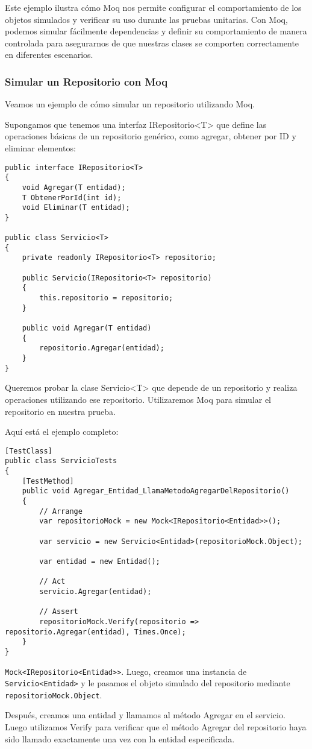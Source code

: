 \documentclass[executivepaper]{article}
\begin{document}
Este ejemplo ilustra cómo Moq nos permite configurar el comportamiento de los objetos simulados y verificar su uso durante las pruebas unitarias. Con Moq, podemos simular fácilmente dependencias y definir su comportamiento de manera controlada para asegurarnos de que nuestras clases se comporten correctamente en diferentes escenarios.

\subsubsection*{Simular un Repositorio con Moq}

Veamos un ejemplo de cómo simular un repositorio utilizando Moq.

Supongamos que tenemos una interfaz IRepositorio<T> que define las operaciones básicas de un repositorio genérico, como agregar, obtener por ID y eliminar elementos:

\begin{lstlisting}
public interface IRepositorio<T>
{
    void Agregar(T entidad);
    T ObtenerPorId(int id);
    void Eliminar(T entidad);
}    

public class Servicio<T>
{
    private readonly IRepositorio<T> repositorio;

    public Servicio(IRepositorio<T> repositorio)
    {
        this.repositorio = repositorio;
    }

    public void Agregar(T entidad)
    {
        repositorio.Agregar(entidad);
    }
}

\end{lstlisting}

Queremos probar la clase Servicio<T> que depende de un repositorio y realiza operaciones utilizando ese repositorio. Utilizaremos Moq para simular el repositorio en nuestra prueba.

Aquí está el ejemplo completo:

\begin{lstlisting}
[TestClass]
public class ServicioTests
{
    [TestMethod]
    public void Agregar_Entidad_LlamaMetodoAgregarDelRepositorio()
    {
        // Arrange
        var repositorioMock = new Mock<IRepositorio<Entidad>>();

        var servicio = new Servicio<Entidad>(repositorioMock.Object);

        var entidad = new Entidad();

        // Act
        servicio.Agregar(entidad);

        // Assert
        repositorioMock.Verify(repositorio => repositorio.Agregar(entidad), Times.Once);
    }
}
\end{lstlisting}

\lstinline{Mock<IRepositorio<Entidad>>}. Luego, creamos una instancia de \lstinline{Servicio<Entidad>} y le pasamos el objeto simulado del repositorio mediante \lstinline{repositorioMock.Object}.

Después, creamos una entidad y llamamos al método Agregar en el servicio. Luego utilizamos Verify para verificar que el método Agregar del repositorio haya sido llamado exactamente una vez con la entidad especificada.
\end{document}
